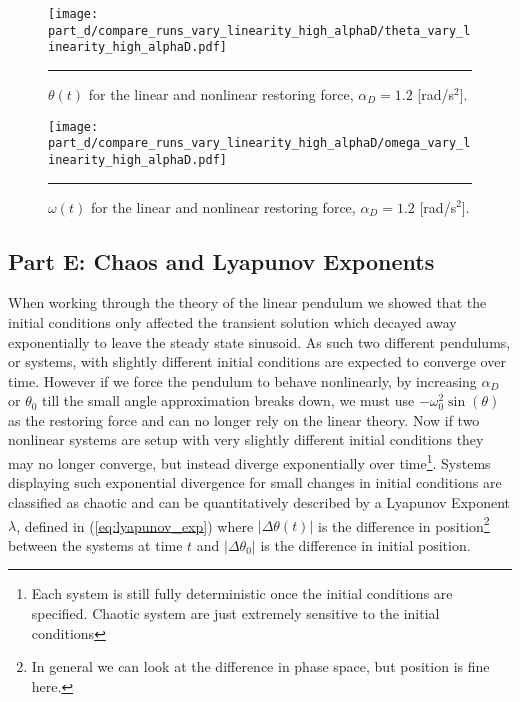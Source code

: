 \documentclass[notitlepage,aps,prd,nofootinbib]{revtex4-1}
\begin{document}
\clearpage
\begin{figure}[!htbc]
  \centering
  \texttt{[image: part\_d/compare\_runs\_vary\_linearity\_high\_alphaD/theta\_vary\_linearity\_high\_alphaD.pdf]}
	{\par\nobreak\rule[9pt]{35em}{0.5pt}\vspace{-5mm}}
	\caption{$\theta\left(t\right)$ for the linear and nonlinear restoring force, $\alpha_{D} = 1.2$ [rad/s$^2$].}
	\label{fig:theta_vary_linearity_high_alphaD}
\end{figure}

\begin{figure}[!htbc]
  \centering
  \texttt{[image: part\_d/compare\_runs\_vary\_linearity\_high\_alphaD/omega\_vary\_linearity\_high\_alphaD.pdf]}
	{\par\nobreak\rule[9pt]{35em}{0.5pt}\vspace{-5mm}}
	\caption{$\omega\left(t\right)$ for the linear and nonlinear restoring force, $\alpha_{D} = 1.2$ [rad/s$^2$].}
	\label{fig:omega_vary_linearity_high_alphaD}
\end{figure}


\clearpage
\subsection{Part E: Chaos and Lyapunov Exponents}
\label{subsec:lyapunov}
When working through the theory of the linear pendulum we showed that the initial conditions only affected the transient solution which decayed away exponentially to leave the steady state sinusoid. As such two different pendulums, or systems, with slightly different initial conditions are expected to converge over time. However if we force the pendulum to behave nonlinearly, by increasing $\alpha_{D}$ or $\theta_{0}$ till the small angle approximation breaks down, we must use $-\omega_{0}^2 \sin\left(\theta\right)$ as the restoring force and can no longer rely on the linear theory. Now if two nonlinear systems are setup with very slightly different initial conditions they may no longer converge, but instead diverge exponentially over time\footnote{Each system is still fully deterministic once the initial conditions are specified. Chaotic system are just extremely sensitive to the initial conditions}. Systems displaying such exponential divergence for small changes in initial conditions are classified as chaotic and can be quantitatively described by a Lyapunov Exponent $\lambda$, defined in (\ref{eq:lyapunov_exp}) where $\left|\Delta\theta\left(t\right)\right|$ is the difference in position\footnote{In general we can look at the difference in phase space, but position is fine here.} between the systems at time $t$ and $\left|\Delta\theta_{0}\right|$ is the difference in initial position.
\end{document}
